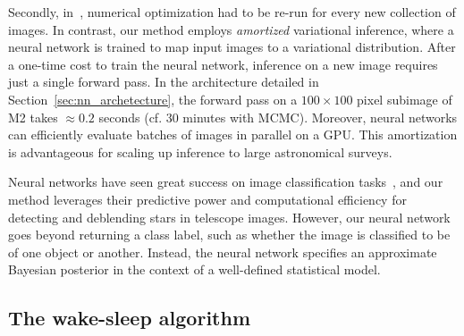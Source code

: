 Secondly, in~\cite{regier2019_celeste}, numerical optimization had to be re-run for every new collection of images. 
In contrast, our method employs {\itshape amortized} variational inference, where a neural network is trained to map input images to a variational distribution.
After a one-time cost to train the neural network, inference 
on a new image requires just a single forward pass.
In the architecture detailed in Section~\ref{sec:nn_archetecture}, the forward pass on 
a $100 \times 100$ pixel subimage of M2 takes $\approx 0.2$ seconds (cf. 30 minutes with MCMC). 
Moreover, neural networks can efficiently evaluate batches of images in parallel on a GPU. 
This amortization is advantageous for scaling up inference to large astronomical surveys.

Neural networks have seen great success on image classification tasks~\cite{imagenet2015}, and our method leverages their predictive power and computational efficiency for detecting and deblending stars in telescope images.
However, our neural network goes beyond returning a class label, such as whether the image is classified to be of one object or another. 
Instead, the neural network specifies an approximate Bayesian posterior in the context of a well-defined statistical model. 

\subsection{The wake-sleep algorithm}


